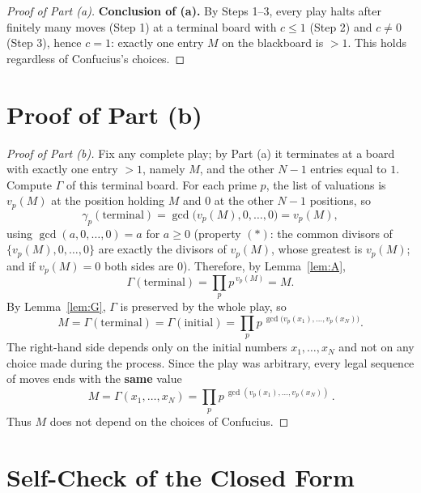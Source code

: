 \documentclass[11pt]{article}
\theoremstyle{plain}
\theoremstyle{definition}
\theoremstyle{remark}
\begin{document}
\begin{proof}[Proof of Part (a)]
\medskip
\textbf{Conclusion of (a).} By Steps 1--3, every play halts after finitely
many moves (Step 1) at a terminal board with $c\le 1$ (Step 2) and $c\ne 0$
(Step 3), hence $c=1$: exactly one entry $M$ on the blackboard is $>1$. This
holds regardless of Confucius's choices.
\end{proof}

\section{Proof of Part (b)}

\begin{proof}[Proof of Part (b)]
Fix any complete play; by Part (a) it terminates at a board with exactly one
entry $>1$, namely $M$, and the other $N-1$ entries equal to $1$. Compute
$\Gamma$ of this terminal board. For each prime $p$, the list of valuations is
$v_p(M)$ at the position holding $M$ and $0$ at the other $N-1$ positions, so
\[
\gamma_p(\text{terminal})=\gcd\bigl(v_p(M),0,\dots,0\bigr)=v_p(M),
\]
using $\gcd(a,0,\dots,0)=a$ for $a\ge 0$ (property $(\ast)$: the common
divisors of $\{v_p(M),0,\dots,0\}$ are exactly the divisors of $v_p(M)$, whose
greatest is $v_p(M)$; and if $v_p(M)=0$ both sides are $0$). Therefore, by
Lemma~\ref{lem:A},
\[
\Gamma(\text{terminal})=\prod_p p^{\,v_p(M)}=M.
\]
By Lemma~\ref{lem:G}, $\Gamma$ is preserved by the whole play, so
\[
M=\Gamma(\text{terminal})=\Gamma(\text{initial})
=\prod_p p^{\ \gcd\bigl(v_p(x_1),\dots,v_p(x_N)\bigr)}.
\]
The right-hand side depends only on the initial numbers $x_1,\dots,x_N$ and
not on any choice made during the process. Since the play was arbitrary,
every legal sequence of moves ends with the \textbf{same} value
\[
\boxed{\,M=\Gamma(x_1,\dots,x_N)=\prod_p p^{\ \gcd\left(v_p(x_1),\dots,v_p(x_N)\right)}\, }.
\]
Thus $M$ does not depend on the choices of Confucius.
\end{proof}

\section*{Self-Check of the Closed Form}
\end{document}
